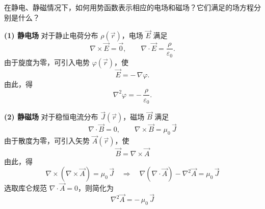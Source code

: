 \documentclass{template}
\begin{document}
\begin{problem}
    在静电、静磁情况下，如何用势函数表示相应的电场和磁场？它们满足的场方程分别是什么？
\end{problem}
\begin{solution}
    \item[\textbf{(1) 静电场}]  
    对于静止电荷分布 \(\rho(\vec r)\)，电场 \(\vec E\) 满足
    \begin{equation}
      \nabla \times \vec E = \vec 0,
      \qquad
      \nabla \cdot \vec E = \frac{\rho}{\varepsilon_0}.
    \end{equation}
    由于旋度为零，可引入电势 \(\varphi(\vec r)\)，使
    \begin{equation}
      \vec E = -\,\nabla \varphi.
    \end{equation}
    由此，得
    \begin{equation}
      \nabla^2 \varphi = -\,\frac{\rho}{\varepsilon_0}.
    \end{equation}

  \item[\textbf{(2) 静磁场}]  
    对于稳恒电流分布 \(\vec J(\vec r)\)，磁场 \(\vec B\) 满足
    \begin{equation}
      \nabla \cdot \vec B = 0,
      \qquad
      \nabla \times \vec B = \mu_0\,\vec J
    \end{equation}
    由于散度为零，可引入矢势 \(\vec A(\vec r)\)，使
    \begin{equation}
      \vec B = \nabla \times \vec A 
    \end{equation}
    由此，得
    \begin{equation}
      \nabla \times (\nabla \times \vec A)
      = \mu_0\,\vec J
      \quad\Longrightarrow\quad
      \nabla(\nabla\!\cdot\!\vec A)
      - \nabla^2 \vec A
      = \mu_0\,\vec J 
    \end{equation}
    选取库仑规范
    \(\nabla\!\cdot\!\vec A = 0\)，则简化为
    \begin{equation}
      \nabla^2 \vec A = -\,\mu_0\,\vec J 
    \end{equation}
\end{solution}
\end{document}

